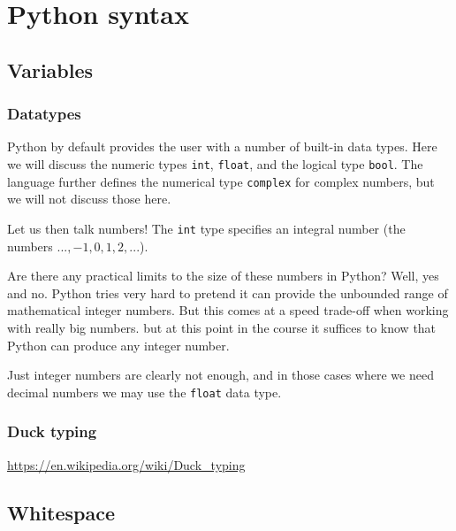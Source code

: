  

\chapter{Python syntax}

	\section{Variables}
		
		\subsection{Datatypes}
		Python by default provides the user with a number of built-in data types. Here we will discuss the numeric types \texttt{int}, \texttt{float}, and the logical type \texttt{bool}. The language further defines the numerical type \texttt{complex} for complex numbers, but we will not discuss those here.

		Let us then talk numbers! The \texttt{int} type specifies an integral number (the numbers $..., -1, 0, 1, 2, ...$). 
		
		 Are there any practical limits to the size of these numbers in Python? Well, yes and no. Python tries very hard to pretend it can provide the unbounded range of mathematical integer numbers. But this comes at a speed trade-off when working with really big numbers. but at this point in the course it suffices to know that Python can produce any integer number.
		
		Just integer numbers are clearly not enough, and in those cases where we need decimal numbers we may use the \texttt{float} data type.
		
		\subsection{Duck typing}
		
		\url{https://en.wikipedia.org/wiki/Duck_typing}
		
	\section{Whitespace}
	
